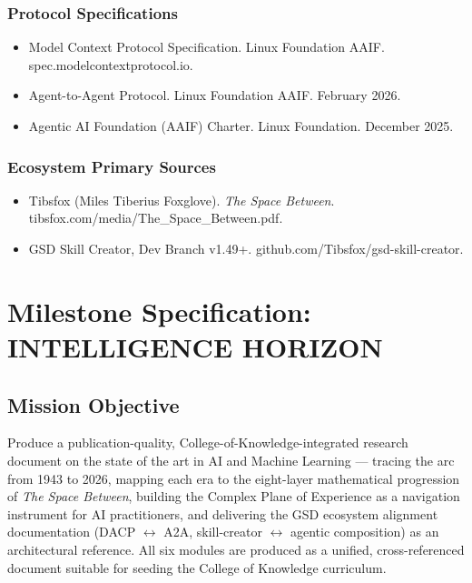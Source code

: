 \documentclass[11pt,letterpaper]{article}
\newcommand{\stageheader}[2]{%
  \noindent\colorbox{#2}{\makebox[\textwidth][l]{%
    \textcolor{white}{\bfseries\sffamily\hspace{6pt}#1\hspace{6pt}}}}%
  \vspace{0.5em}\par%
}
\begin{document}
\subsubsection{Protocol Specifications}
\begin{itemize}[leftmargin=*]
\item Model Context Protocol Specification. Linux Foundation AAIF. spec.modelcontextprotocol.io.
\item Agent-to-Agent Protocol. Linux Foundation AAIF. February 2026.
\item Agentic AI Foundation (AAIF) Charter. Linux Foundation. December 2025.
\end{itemize}

\subsubsection{Ecosystem Primary Sources}
\begin{itemize}[leftmargin=*]
\item Tibsfox (Miles Tiberius Foxglove). \textit{The Space Between}. tibsfox.com/media/The\_Space\_Between.pdf.
\item GSD Skill Creator, Dev Branch v1.49+. github.com/Tibsfox/gsd-skill-creator.
\end{itemize}

\newpage

\stageheader{STAGE 3 \textemdash{} MISSION PACKAGE}{tertiary}

\section{Milestone Specification: INTELLIGENCE HORIZON}

\subsection{Mission Objective}

Produce a publication-quality, College-of-Knowledge-integrated research document on the state of the art in AI and Machine Learning --- tracing the arc from 1943 to 2026, mapping each era to the eight-layer mathematical progression of \textit{The Space Between}, building the Complex Plane of Experience as a navigation instrument for AI practitioners, and delivering the GSD ecosystem alignment documentation (DACP $\leftrightarrow$ A2A, skill-creator $\leftrightarrow$ agentic composition) as an architectural reference. All six modules are produced as a unified, cross-referenced document suitable for seeding the College of Knowledge curriculum.
\end{document}
